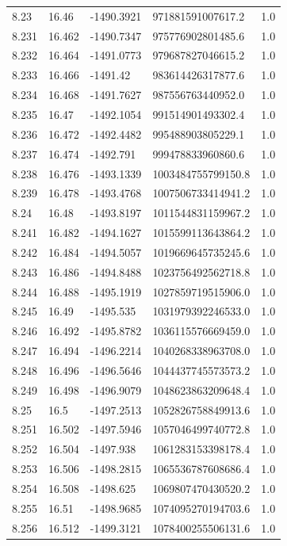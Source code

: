 \begin{tabular}{lllll}
8.23 & 16.46 & -1490.3921 & 971881591007617.2 & 1.0 \\
8.231 & 16.462 & -1490.7347 & 975776902801485.6 & 1.0 \\
8.232 & 16.464 & -1491.0773 & 979687827046615.2 & 1.0 \\
8.233 & 16.466 & -1491.42 & 983614426317877.6 & 1.0 \\
8.234 & 16.468 & -1491.7627 & 987556763440952.0 & 1.0 \\
8.235 & 16.47 & -1492.1054 & 991514901493302.4 & 1.0 \\
8.236 & 16.472 & -1492.4482 & 995488903805229.1 & 1.0 \\
8.237 & 16.474 & -1492.791 & 999478833960860.6 & 1.0 \\
8.238 & 16.476 & -1493.1339 & 1003484755799150.8 & 1.0 \\
8.239 & 16.478 & -1493.4768 & 1007506733414941.2 & 1.0 \\
8.24 & 16.48 & -1493.8197 & 1011544831159967.2 & 1.0 \\
8.241 & 16.482 & -1494.1627 & 1015599113643864.2 & 1.0 \\
8.242 & 16.484 & -1494.5057 & 1019669645735245.6 & 1.0 \\
8.243 & 16.486 & -1494.8488 & 1023756492562718.8 & 1.0 \\
8.244 & 16.488 & -1495.1919 & 1027859719515906.0 & 1.0 \\
8.245 & 16.49 & -1495.535 & 1031979392246533.0 & 1.0 \\
8.246 & 16.492 & -1495.8782 & 1036115576669459.0 & 1.0 \\
8.247 & 16.494 & -1496.2214 & 1040268338963708.0 & 1.0 \\
8.248 & 16.496 & -1496.5646 & 1044437745573573.2 & 1.0 \\
8.249 & 16.498 & -1496.9079 & 1048623863209648.4 & 1.0 \\
8.25 & 16.5 & -1497.2513 & 1052826758849913.6 & 1.0 \\
8.251 & 16.502 & -1497.5946 & 1057046499740772.8 & 1.0 \\
8.252 & 16.504 & -1497.938 & 1061283153398178.4 & 1.0 \\
8.253 & 16.506 & -1498.2815 & 1065536787608686.4 & 1.0 \\
8.254 & 16.508 & -1498.625 & 1069807470430520.2 & 1.0 \\
8.255 & 16.51 & -1498.9685 & 1074095270194703.6 & 1.0 \\
8.256 & 16.512 & -1499.3121 & 1078400255506131.6 & 1.0 \\

\end{tabular}
